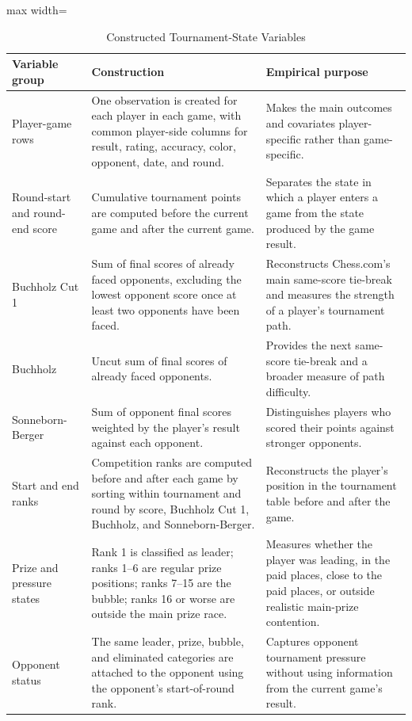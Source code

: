 \begin{table}[htbp]
\centering
\footnotesize
\caption{Constructed Tournament-State Variables}
\label{tab:tournament-state-variables}
\begin{adjustbox}{max width=\textwidth}
\begin{tabular}{@{}p{}p{}p{}@{}}
\toprule
Variable group & Construction & Empirical purpose \\
\midrule
Player-game rows & One observation is created for each player in each game, with common player-side columns for result, rating, accuracy, color, opponent, date, and round. & Makes the main outcomes and covariates player-specific rather than game-specific. \\
Round-start and round-end score & Cumulative tournament points are computed before the current game and after the current game. & Separates the state in which a player enters a game from the state produced by the game result. \\
Buchholz Cut 1 & Sum of final scores of already faced opponents, excluding the lowest opponent score once at least two opponents have been faced. & Reconstructs Chess.com's main same-score tie-break and measures the strength of a player's tournament path. \\
Buchholz & Uncut sum of final scores of already faced opponents. & Provides the next same-score tie-break and a broader measure of path difficulty. \\
Sonneborn-Berger & Sum of opponent final scores weighted by the player's result against each opponent. & Distinguishes players who scored their points against stronger opponents. \\
Start and end ranks & Competition ranks are computed before and after each game by sorting within tournament and round by score, Buchholz Cut 1, Buchholz, and Sonneborn-Berger. & Reconstructs the player's position in the tournament table before and after the game. \\
Prize and pressure states & Rank 1 is classified as leader; ranks 1--6 are regular prize positions; ranks 7--15 are the bubble; ranks 16 or worse are outside the main prize race. & Measures whether the player was leading, in the paid places, close to the paid places, or outside realistic main-prize contention. \\
Opponent status & The same leader, prize, bubble, and eliminated categories are attached to the opponent using the opponent's start-of-round rank. & Captures opponent tournament pressure without using information from the current game's result. \\
\bottomrule
\end{tabular}
\end{adjustbox}
\end{table}

